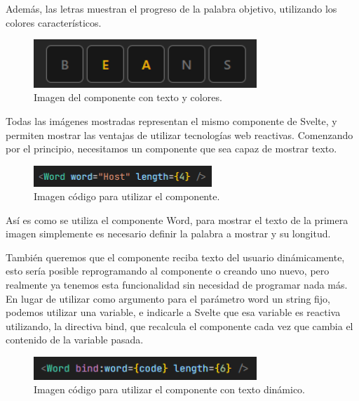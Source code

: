 Además, las letras muestran el progreso de la palabra objetivo, utilizando los colores característicos.

\begin{figure}[H]
	\centering
	\includegraphics[clip=true, width=0.75\textwidth]{images/reusing/colored_component.png}
	\caption{Imagen del componente con texto y colores.}
	\label{fig:comp_colored}
\end{figure}

Todas las imágenes mostradas representan el mismo componente de Svelte, y permiten mostrar las ventajas de utilizar tecnologías web reactivas.
Comenzando por el principio, necesitamos un componente que sea capaz de mostrar texto.

\begin{figure}[H]
	\centering
	\includegraphics[clip=true, width=0.6\textwidth]{images/reusing/code_simple_component.png}
	\caption{Imagen código para utilizar el componente.}
	\label{fig:comp_simple_code}
\end{figure}

Así es como se utiliza el componente Word, para mostrar el texto de la primera imagen simplemente es necesario definir la palabra a mostrar y su longitud.

También queremos que el componente reciba texto del usuario dinámicamente, esto sería posible reprogramando al componente o creando uno nuevo, pero realmente ya tenemos esta funcionalidad sin necesidad de programar nada más. En lugar de utilizar como argumento para el parámetro word un string fijo, podemos utilizar una variable, e indicarle a Svelte que esa variable es reactiva utilizando, la directiva bind, que recalcula el componente cada vez que cambia el contenido de la variable pasada.

\begin{figure}[H]
	\centering
	\includegraphics[clip=true, width=0.75\textwidth]{images/reusing/code_dyn_component.png}
	\caption{Imagen código para utilizar el componente con texto dinámico.}
	\label{fig:comp_dyn_code}
\end{figure}

